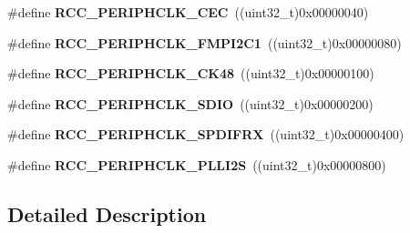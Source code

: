 \begin{DoxyCompactItemize}
\item 
\#define {\bfseries R\+C\+C\+\_\+\+P\+E\+R\+I\+P\+H\+C\+L\+K\+\_\+\+C\+EC}~((uint32\+\_\+t)0x00000040)\hypertarget{group___r_c_c_ex___periph___clock___selection_gae7b08ed2b8df3517d5de1013e2f4ac8e}{}\label{group___r_c_c_ex___periph___clock___selection_gae7b08ed2b8df3517d5de1013e2f4ac8e}

\item 
\#define {\bfseries R\+C\+C\+\_\+\+P\+E\+R\+I\+P\+H\+C\+L\+K\+\_\+\+F\+M\+P\+I2\+C1}~((uint32\+\_\+t)0x00000080)\hypertarget{group___r_c_c_ex___periph___clock___selection_ga52896622c5ac8dc8a5ffc7e2befbb466}{}\label{group___r_c_c_ex___periph___clock___selection_ga52896622c5ac8dc8a5ffc7e2befbb466}

\item 
\#define {\bfseries R\+C\+C\+\_\+\+P\+E\+R\+I\+P\+H\+C\+L\+K\+\_\+\+C\+K48}~((uint32\+\_\+t)0x00000100)\hypertarget{group___r_c_c_ex___periph___clock___selection_ga3ee6866f9d2349cd1a099407d2a7664b}{}\label{group___r_c_c_ex___periph___clock___selection_ga3ee6866f9d2349cd1a099407d2a7664b}

\item 
\#define {\bfseries R\+C\+C\+\_\+\+P\+E\+R\+I\+P\+H\+C\+L\+K\+\_\+\+S\+D\+IO}~((uint32\+\_\+t)0x00000200)\hypertarget{group___r_c_c_ex___periph___clock___selection_ga995e99530a7996e794d1527b04f611aa}{}\label{group___r_c_c_ex___periph___clock___selection_ga995e99530a7996e794d1527b04f611aa}

\item 
\#define {\bfseries R\+C\+C\+\_\+\+P\+E\+R\+I\+P\+H\+C\+L\+K\+\_\+\+S\+P\+D\+I\+F\+RX}~((uint32\+\_\+t)0x00000400)\hypertarget{group___r_c_c_ex___periph___clock___selection_gae696b64cfe8a0c2ba96030c427fa77d5}{}\label{group___r_c_c_ex___periph___clock___selection_gae696b64cfe8a0c2ba96030c427fa77d5}

\item 
\#define {\bfseries R\+C\+C\+\_\+\+P\+E\+R\+I\+P\+H\+C\+L\+K\+\_\+\+P\+L\+L\+I2S}~((uint32\+\_\+t)0x00000800)\hypertarget{group___r_c_c_ex___periph___clock___selection_ga31b35acf124831881c39c31f4bed5de2}{}\label{group___r_c_c_ex___periph___clock___selection_ga31b35acf124831881c39c31f4bed5de2}

\end{DoxyCompactItemize}


\subsection{Detailed Description}
